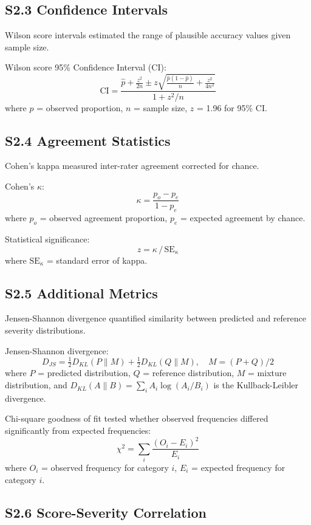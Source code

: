 \documentclass[12pt,a4paper]{article}
\begin{document}
\bigskip
\subsection{S2.3 Confidence Intervals}

Wilson score intervals estimated the range of plausible accuracy values given sample size.

Wilson score 95\% Confidence Interval (CI):
\[
\text{CI} = \frac{\hat{p} + \frac{z^2}{2n} \pm z\sqrt{\frac{\hat{p}(1-\hat{p})}{n} + \frac{z^2}{4n^2}}}{1 + z^2/n}
\]
where $\hat{p}$ = observed proportion, $n$ = sample size, $z$ = 1.96 for 95\% CI.

\bigskip
\subsection{S2.4 Agreement Statistics}

Cohen's kappa measured inter-rater agreement corrected for chance.

Cohen's $\kappa$:
\[
\kappa = \frac{p_o - p_e}{1 - p_e}
\]
where $p_o$ = observed agreement proportion, $p_e$ = expected agreement by chance.

Statistical significance:
\[
z = \kappa \,/\, \text{SE}_{\kappa}
\]
where $\text{SE}_{\kappa}$ = standard error of kappa.

\bigskip
\subsection{S2.5 Additional Metrics}

Jensen-Shannon divergence quantified similarity between predicted and reference severity distributions.

Jensen-Shannon divergence:
\[
D_{JS} = \tfrac{1}{2} D_{KL}(P \| M) + \tfrac{1}{2} D_{KL}(Q \| M), \quad M = (P + Q)/2
\]
where $P$ = predicted distribution, $Q$ = reference distribution, $M$ = mixture distribution, and $D_{KL}(A \| B) = \sum_i A_i \log(A_i / B_i)$ is the Kullback-Leibler divergence.

Chi-square goodness of fit tested whether observed frequencies differed significantly from expected frequencies:
\[
\chi^2 = \sum_i \frac{(O_i - E_i)^2}{E_i}
\]
where $O_i$ = observed frequency for category $i$, $E_i$ = expected frequency for category $i$.

\bigskip
\subsection{S2.6 Score-Severity Correlation}
\end{document}
